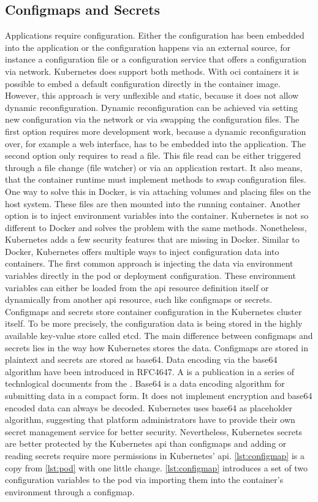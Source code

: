 \documentclass[titlepage]{report}
\begin{document}
\subsection{Configmaps and Secrets}
Applications require configuration. Either the configuration has been embedded into the application or the configuration happens via an external source, for instance a configuration file or a configuration service that offers a configuration via network.
Kubernetes does support both methods. With \gls{oci} containers it is possible to embed a default configuration directly in the container image. However, this approach is very unflexible and static, because it does not allow dynamic reconfiguration.
Dynamic reconfiguration can be achieved via setting new configuration via the network or via swapping the configuration files. The first option requires more development work, because a dynamic reconfiguration over, for example a web interface,
has to be embedded into the application. The second option only requires to read a file. This file read can be either triggered through a file change (file watcher) or via an application restart. It also means, that the container runtime must
implement methods to swap configuration files. One way to solve this in Docker, is via attaching volumes and placing files on the host system. These files are then mounted into the running container. Another option is to inject environment variables
into the container. Kubernetes is not so different to Docker and solves the problem with the same methods. Nonetheless, Kubernetes adds a few security features that are missing in Docker. Similar to Docker, Kubernetes offers multiple ways to inject
configuration data into containers. The first common approach is injecting the data via environment variables directly in the pod or deployment configuration. These environment variables can either be loaded from the \gls{api} resource definition itself
or dynamically from another \gls{api} resource, such like configmaps or secrets. Configmaps and secrets store container configuration in the Kubernetes cluster itself. To be more precisely, the configuration data is being stored in the highly available
key-value store called etcd. The main difference between configmaps and secrets lies in the way how Kubernetes stores the data. Configmaps are stored in plaintext and secrets are stored as base64. Data encoding via the base64 algorithm have been introduced
in RFC4647\cite{RFC4648}. A  is a publication in a series of technlogical documents from the \cite{WikipediaRFC}. Base64 is a data encoding algorithm for submitting data in a compact form. It does not implement encryption and
base64 encoded data can always be decoded. Kubernetes uses base64 as placeholder algorithm, suggesting that platform administrators have to provide their own secret management service for better security. Nevertheless, Kubernetes secrets are better protected
by the Kubernetes \gls{api} than configmaps and adding or reading secrets require more permissions in Kubernetes' \gls{api}. \autoref{lst:configmap} is a copy from \autoref{lst:pod} with one little change. \autoref{lst:configmap} introduces
a set of two configuration variables to the pod via importing them into the container's environment through a configmap. 
\end{document}
